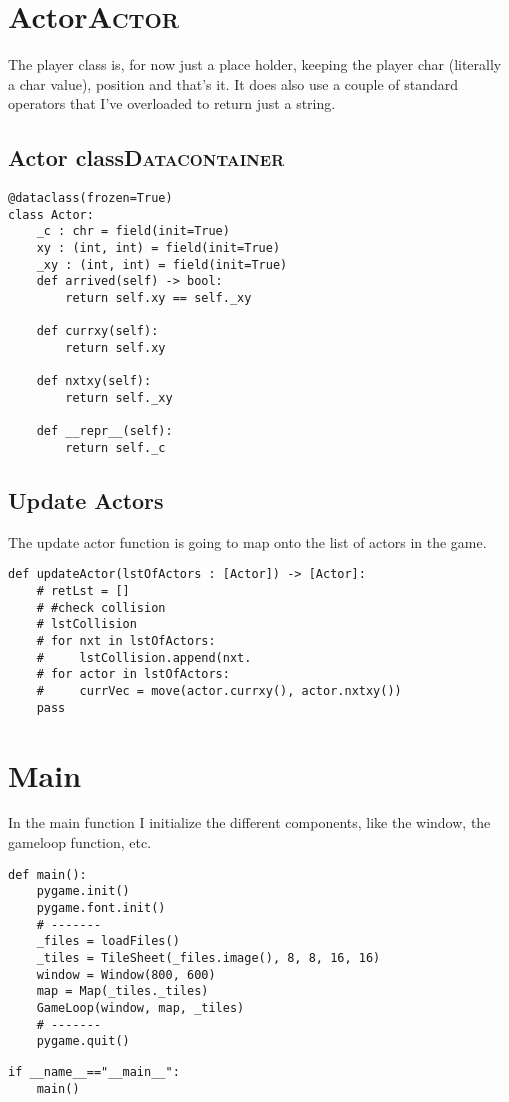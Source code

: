 \documentclass[11pt]{article}
\begin{document}
\section{Actor\hfill{}\textsc{Actor}}
\label{sec:org007a2f5}

The player class is, for now just a place holder, keeping the player char (literally a char value), position and that's it. It does also use a couple of standard operators that I've overloaded to return just a string.


\subsection{Actor class\hfill{}\textsc{Datacontainer}}
\label{sec:org54f1a8e}
\begin{verbatim}
@dataclass(frozen=True)
class Actor:
    _c : chr = field(init=True)
    xy : (int, int) = field(init=True)
    _xy : (int, int) = field(init=True)
    def arrived(self) -> bool:
        return self.xy == self._xy

    def currxy(self):
        return self.xy

    def nxtxy(self):
        return self._xy

    def __repr__(self):
        return self._c
\end{verbatim}


\subsection{Update Actors}
\label{sec:org5fb9c53}

The update actor function is going to map onto the list of actors in the game.

\begin{verbatim}
def updateActor(lstOfActors : [Actor]) -> [Actor]:
    # retLst = []
    # #check collision
    # lstCollision
    # for nxt in lstOfActors:
    #     lstCollision.append(nxt.
    # for actor in lstOfActors:
    #     currVec = move(actor.currxy(), actor.nxtxy())
    pass
\end{verbatim}



\section{Main}
\label{sec:orgb23b180}

In the main function I initialize the different components, like the window, the gameloop function, etc.

\begin{verbatim}
def main():
    pygame.init()
    pygame.font.init()
    # -------
    _files = loadFiles()
    _tiles = TileSheet(_files.image(), 8, 8, 16, 16)
    window = Window(800, 600)
    map = Map(_tiles._tiles)
    GameLoop(window, map, _tiles)
    # -------
    pygame.quit()
\end{verbatim}



\begin{verbatim}
if __name__=="__main__":
    main()
\end{verbatim}
\end{document}
